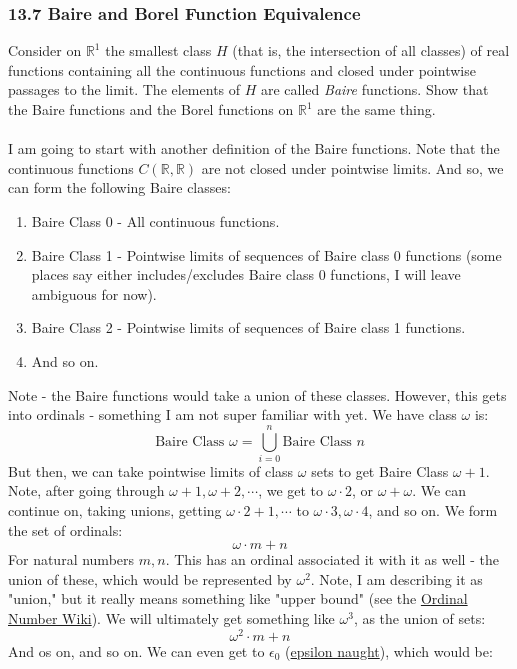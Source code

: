 \documentclass[12pt,a4paper]{article}
\newcommand{\1}[1]{\mathbbm{1}\left\{ #1 \right\}}
\newcommand{\R}{\mathbb{R}}
\begin{document}
\subsubsection{13.7 Baire and Borel Function Equivalence} Consider on $\R^1$ the smallest class $H$ (that is, the intersection of all classes) of real functions containing all the continuous functions and closed under pointwise passages to the limit. The elements of $H$ are called \textit{Baire} functions. Show that the Baire functions and the Borel functions on $\R^1$ are the same thing.
\\\\
I am going to start with another definition of the Baire functions. Note that the continuous functions $C(\R,\R)$ are not closed under pointwise limits. And so, we can form the following Baire classes:
\begin{enumerate}
	\item Baire Class 0 - All continuous functions.
	\item Baire Class 1 - Pointwise limits of sequences of Baire class 0 functions (some places say either includes/excludes Baire class 0 functions, I will leave ambiguous for now).
	\item Baire Class 2 - Pointwise limits of sequences of Baire class 1 functions.
	\item And so on.
\end{enumerate}
Note - the Baire functions would take a union of these classes. However, this gets into ordinals - something I am not super familiar with yet. We have class $\omega$ is:
$$
	\text{Baire Class $\omega =$} \bigcup_{i=0}^n \text{Baire Class $n$}
$$
But then, we can take pointwise limits of class $\omega$ sets to get Baire Class $\omega + 1$. Note, after going through $\omega + 1, \omega + 2, \cdots$, we get to $\omega \cdot 2$, or $\omega + \omega$. We can continue on, taking unions, getting $\omega \cdot 2 + 1, \cdots$ to $\omega \cdot 3, \omega \cdot 4$, and so on. We form the set of ordinals:
$$
	\omega \cdot m + n
$$
For natural numbers $m,n$. This has an ordinal associated it with it as well - the union of these, which would be represented by $\omega^2$. Note, I am describing it as "union," but it really means something like "upper bound" (see the \href{https://en.wikipedia.org/wiki/Ordinal_number}{Ordinal Number Wiki}). We will ultimately get something like $\omega^3$, as the union of sets:
$$
	\omega^2 \cdot m + n
$$
And os on, and so on. We can even get to $\epsilon_0$ (\href{https://en.wikipedia.org/wiki/Epsilon_number}{epsilon naught}), which would be:
\end{document}
